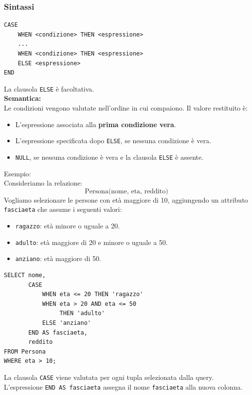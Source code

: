\subsubsection*{Sintassi}
\begin{verbatim}
CASE
    WHEN <condizione> THEN <espressione>
    ...
    WHEN <condizione> THEN <espressione>
    ELSE <espressione>
END
\end{verbatim}
La clausola \texttt{ELSE} è facoltativa.\\
\textbf{Semantica:}\\
Le condizioni vengono valutate nell'ordine in cui compaiono.
Il valore restituito è:
\begin{itemize}
    \item L'espressione associata alla
    \textbf{prima condizione vera}.

    \item L'espressione specificata dopo
    \texttt{ELSE}, se nessuna condizione è vera.

    \item \texttt{NULL}, se nessuna condizione
    è vera e la clausola \texttt{ELSE} è assente.
\end{itemize}

\noindent \textcolor{verdeEsempio}{Esempio: }\\
Consideriamo la relazione:
\[
\text{Persona(nome, eta, reddito)}
\]
Vogliamo selezionare le persone con età maggiore di 10,
aggiungendo un attributo \texttt{fasciaeta} che assume
i seguenti valori:
\begin{itemize}
    \item \texttt{ragazzo}: età minore o uguale a 20.
    \item \texttt{adulto}: età maggiore di 20 e
    minore o uguale a 50.
    \item \texttt{anziano}: età maggiore di 50.
\end{itemize}
\begin{verbatim}
SELECT nome,
       CASE
           WHEN eta <= 20 THEN 'ragazzo'
           WHEN eta > 20 AND eta <= 50
                THEN 'adulto'
           ELSE 'anziano'
       END AS fasciaeta,
       reddito
FROM Persona
WHERE eta > 10;
\end{verbatim}
La clausola \texttt{CASE} viene valutata per ogni
tupla selezionata dalla query.
L'espressione \texttt{END AS fasciaeta} assegna
il nome \texttt{fasciaeta} alla nuova colonna.

